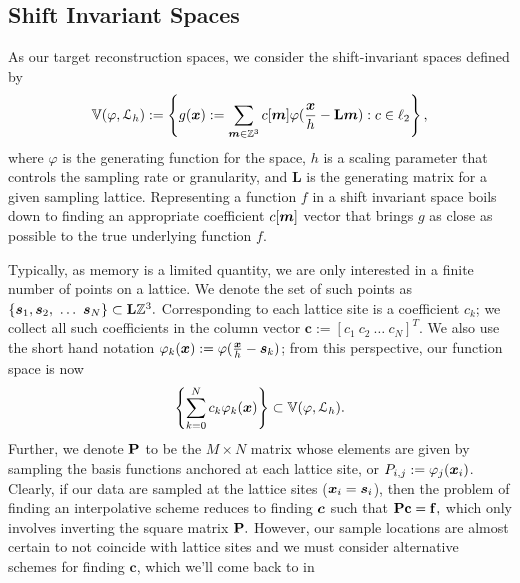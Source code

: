 \subsection{Shift Invariant Spaces} \label{sec:sis_review}
As our target reconstruction spaces, we consider the shift-invariant spaces defined by {\small 
\begin{equation*}
	\mathbb{V}(\varphi,  \mathcal{L}_h) := \left\{ g(\boldsymbol{x}) := \displaystyle\sum_{\boldsymbol{m} \in \mathbb{Z}^3} c[\boldsymbol{m}]\varphi(\frac{\boldsymbol{x}}{h} - \mathbf{L}\boldsymbol{m}) : c \in \ell_2 \right\},
\end{equation*}}
where $\varphi$ is the generating function for the space, $h$ is a scaling parameter that controls the sampling rate or granularity, and $\mathbf{L}$ is the generating matrix for a given sampling lattice. Representing a function $f$ in a shift invariant space boils down to finding an appropriate coefficient $c[\boldsymbol{m}]$ vector that brings $g$ as close as possible to the true underlying function $f$. 

Typically, as memory is a limited quantity, we are only interested in a finite number of points on a lattice. We denote the set of such points as $\{\vect{s}_1,\vect{s}_2,\ \hdots  \ \vect{s}_N\} \subset \mathbf{L}\intn^3.$ Corresponding to each lattice site is a coefficient $c_k$; we collect all such coefficients in the column vector $\mathbf{c}:=\left[c_1 \ c_2 \ \hdots \ c_N \right]^T.$ We also use the short hand notation $\varphi_k(\boldsymbol{x}) := \varphi(\frac{\boldsymbol{x}}{h}-\boldsymbol{s}_k)$; from this perspective, our function space is now {\small 
\begin{equation}
	\left\{ \displaystyle\sum_{k=0}^N c_k \varphi_k(\boldsymbol{x}) \right\} \subset \mathbb{V}(\varphi, \mathcal{L}_h).
\end{equation}}
Further, we denote $\mathbf{\mathbf{P}}$ to be the $M \times N$ matrix whose elements are given by sampling the basis functions anchored at each lattice site, or $P_{i,j} := \varphi_j(\boldsymbol{x}_i)$. Clearly, if our data are sampled at the lattice sites ($\boldsymbol{x}_i = \boldsymbol{s}_i$), then the problem of finding an interpolative scheme reduces to finding $\boldsymbol{c}$ such that $\mathbf{\mathbf{P} c=f},$ which only involves inverting the square matrix $\mathbf{\mathbf{P}}.$ However, our sample locations are almost certain to not coincide with lattice sites and we must consider alternative schemes for finding $\mathbf{c}$, which we'll come back to in 

